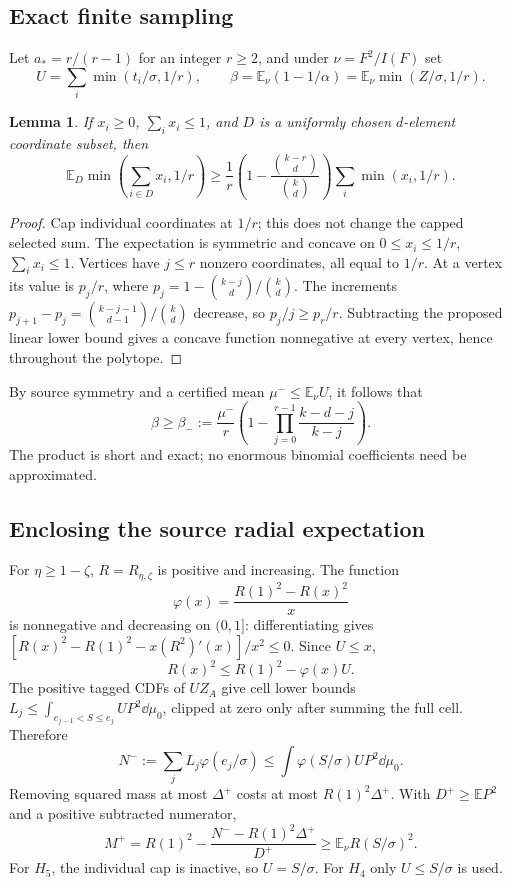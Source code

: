 \documentclass[11pt,a4paper]{article}
\newtheorem{lemma}[theorem]{Lemma}
\theoremstyle{definition}\newtheorem{definition}[theorem]{Definition}
\theoremstyle{remark}\newtheorem{remark}[theorem]{Remark}
\newcommand{\E}{\mathbb E}\newcommand{\Prob}{\mathbb P}
\numberwithin{equation}{section}
\begin{document}
\subsection{Exact finite sampling}
Let $a_*=r/(r-1)$ for an integer $r\ge2$, and under $\nu=F^2/I(F)$ set
\[
 U=\sum_i\min(t_i/\sigma,1/r),\qquad
 \beta=\E_\nu(1-1/\alpha)=\E_\nu\min(Z/\sigma,1/r).
\]
\begin{lemma}\label{lem:sampling}
If $x_i\ge0$, $\sum_i x_i\le1$, and $D$ is a uniformly chosen $d$-element coordinate subset, then
\[
 \E_D\min\left(\sum_{i\in D}x_i,1/r\right)
 \ge\frac1r\left(1-\frac{\binom{k-r}{d}}{\binom{k}{d}}\right)
 \sum_i\min(x_i,1/r).
\]
\end{lemma}
\begin{proof}
Cap individual coordinates at $1/r$; this does not change the capped selected sum. The expectation is symmetric and concave on $0\le x_i\le1/r$, $\sum_i x_i\le1$. Vertices have $j\le r$ nonzero coordinates, all equal to $1/r$. At a vertex its value is $p_j/r$, where
$p_j=1-\binom{k-j}{d}/\binom{k}{d}$. The increments $p_{j+1}-p_j=\binom{k-j-1}{d-1}/\binom{k}{d}$ decrease, so $p_j/j\ge p_r/r$. Subtracting the proposed linear lower bound gives a concave function nonnegative at every vertex, hence throughout the polytope.
\end{proof}
By source symmetry and a certified mean $\mu^-\le\E_\nu U$, it follows that
\begin{equation}\label{eq:beta}
 \beta\ge\beta_-:=\frac{\mu^-}{r}
 \left(1-\prod_{j=0}^{r-1}\frac{k-d-j}{k-j}\right).
\end{equation}
The product is short and exact; no enormous binomial coefficients need be approximated.

\subsection{Enclosing the source radial expectation}
For $\eta\ge1-\zeta$, $R=R_{\eta,\zeta}$ is positive and increasing. The function
\[
 \varphi(x)=\frac{R(1)^2-R(x)^2}{x}
\]
is nonnegative and decreasing on $(0,1]$: differentiating gives
$[R(x)^2-R(1)^2-x(R^2)'(x)]/x^2\le0$. Since $U\le x$,
\[
 R(x)^2\le R(1)^2-\varphi(x)U.
\]
The positive tagged CDFs of $UZ_A$ give cell lower bounds
$L_j\le\int_{e_{j-1}<S\le e_j}UP^2\dd\mu_0$, clipped at zero only after summing the full cell. Therefore
\[
 N^-:=\sum_jL_j\varphi(e_j/\sigma)
 \le\int\varphi(S/\sigma)UP^2\dd\mu_0.
\]
Removing squared mass at most $\Delta^+$ costs at most $R(1)^2\Delta^+$. With $D^+\ge\E P^2$ and a positive subtracted numerator,
\begin{equation}\label{eq:radialM}
 M^+=R(1)^2-\frac{N^- -R(1)^2\Delta^+}{D^+}
 \ge\E_\nu R(S/\sigma)^2.
\end{equation}
For $H_5$, the individual cap is inactive, so $U=S/\sigma$. For $H_4$ only $U\le S/\sigma$ is used.
\end{document}
